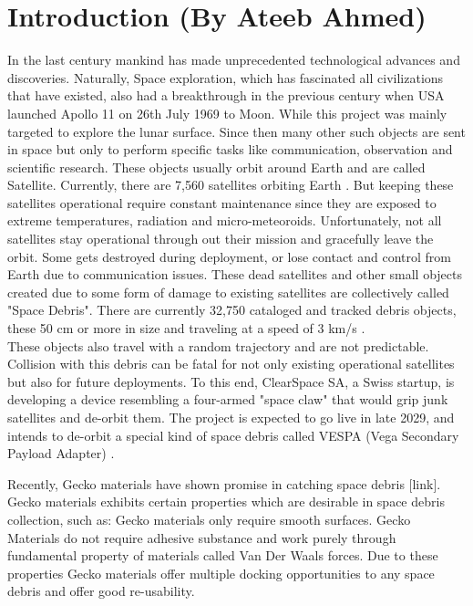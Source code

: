 \documentclass[
    twocolumn,
    fontsize = 10pt,
    parskip = half+,
    headings = small,
    headwidth = text,
    footwidth = text,
]{scrartcl}
\begin{document}
\section{Introduction \textnormal{(By Ateeb  Ahmed)}}
In the last century mankind has made unprecedented technological advances and discoveries. Naturally, Space exploration, which has fascinated all civilizations that have existed, also had a breakthrough in the previous century when USA launched Apollo 11 on 26th July 1969 to Moon. While this project was mainly targeted to explore the lunar surface. Since then many other such objects are sent in space but only to perform specific tasks like communication, observation and scientific research. These objects usually orbit around Earth and are called Satellite. 
Currently, there are 7,560 satellites orbiting Earth \cite{ucs}. But keeping these satellites operational require constant maintenance since they are exposed to extreme temperatures, radiation and micro-meteoroids. Unfortunately, not all satellites stay operational through out their mission and gracefully leave the orbit. Some gets destroyed during deployment, or lose contact and control from Earth due to communication issues. These dead satellites and other small objects created due to some form of damage to existing satellites are collectively called "Space Debris". 
There are currently 32,750 cataloged and tracked debris objects, these 50 cm or more in size and traveling at a speed of 3 km/s \cite{space_junk}. \\

These objects also travel with a random trajectory and are not predictable. Collision with this debris can be fatal for not only existing operational satellites but also for future deployments. To this end, ClearSpace SA, a Swiss startup, is developing a device resembling a four-armed "space claw" that would grip junk satellites and de-orbit them. The project is expected to go live in late 2029, and intends to de-orbit a special kind of space debris called VESPA (Vega Secondary Payload Adapter) \cite{clear_space}. 

Recently, Gecko materials have shown promise in catching space debris [link]. Gecko materials exhibits certain properties which are desirable in space debris collection, such as: Gecko materials only require smooth surfaces. Gecko Materials do not require adhesive substance and work purely through fundamental property of materials called Van Der Waals forces. Due to these properties Gecko materials offer multiple docking opportunities to any space debris and offer good re-usability.
\end{document}
